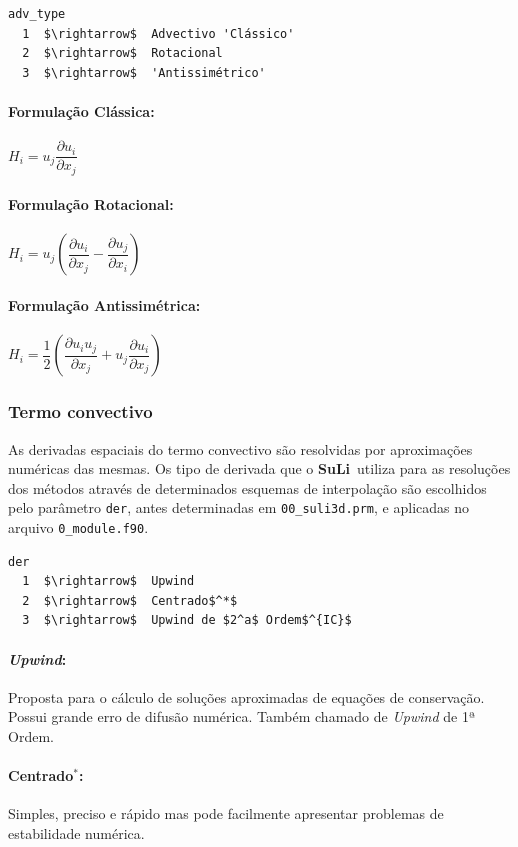 \documentclass[12pt, a4paper]{article}
\newcommand{\SL}{{\bf SuLi}}
\begin{document}
\begin{lstlisting}[escapeinside='']
adv_type  
  1  $\rightarrow$  Advectivo 'Clássico'
  2  $\rightarrow$  Rotacional
  3  $\rightarrow$  'Antissimétrico'
\end{lstlisting}

\paragraph{Formulação Clássica:} $H_i = u_j  \dfrac{\partial u_i}{\partial x_j}$
\paragraph{Formulação Rotacional:} $H_i = u_j \left(\dfrac{\partial u_i}{\partial x_j} - \dfrac{\partial u_j}{\partial x_i}\right)$
\paragraph{Formulação Antissimétrica:} $H_i = \dfrac{1}{2} \left(\dfrac{\partial u_i u_j}{\partial x_j} + u_j\dfrac{\partial u_i}{\partial x_j}\right)$

\subsubsection{Termo convectivo}
As derivadas espaciais do termo convectivo são resolvidas por aproximações numéricas das mesmas. Os tipo de derivada que o \SL\ utiliza para as resoluções dos métodos através de determinados esquemas de interpolação são escolhidos pelo parâmetro \verb|der|, antes determinadas em \verb|00_suli3d.prm|, e aplicadas no arquivo \verb|0_module.f90|.
\begin{lstlisting}[escapeinside='']
der	
  1  $\rightarrow$  Upwind
  2  $\rightarrow$  Centrado$^*$
  3  $\rightarrow$  Upwind de $2^a$ Ordem$^{IC}$
\end{lstlisting}

\paragraph{\textit{Upwind}:} Proposta para o cálculo de soluções aproximadas de equações de conservação. Possui grande erro de difusão numérica. Também chamado de \textit{Upwind} de 1ª Ordem.
\paragraph{Centrado$^{*}$:} Simples, preciso e rápido mas pode facilmente apresentar problemas de estabilidade numérica.
\end{document}
